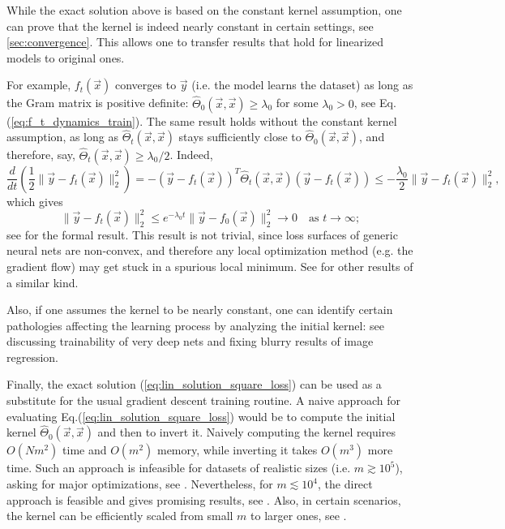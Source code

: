 \documentclass{article}
\begin{document}
    While the exact solution above is based on the constant kernel assumption, one can prove that the kernel is indeed nearly constant in certain settings, see \cref{sec:convergence}.
    This allows one to transfer results that hold for linearized models to original ones.
    
    For example, $f_t(\vec x)$ converges to $\vec y$ (i.e. the model learns the dataset) as long as the Gram matrix is positive definite: $\hat\Theta_0(\vec x,\vec x) \geq \lambda_0$ for some $\lambda_0 > 0$, see Eq.(\ref{eq:f_t_dynamics_train}).
    The same result holds without the constant kernel assumption, as long as $\hat\Theta_t(\vec x,\vec x)$ stays sufficiently close to $\hat\Theta_0(\vec x,\vec x)$, and therefore, say, $\hat\Theta_t(\vec x,\vec x) \geq \lambda_0/2$.
    Indeed,
    \begin{equation}
        \frac{d}{dt}\left(\frac{1}{2} \| \vec y - f_t(\vec x) \|_2^2\right)
        = -(\vec y - f_t(\vec x))^T \hat\Theta_t(\vec x, \vec x) (\vec y - f_t(\vec x))
        \leq -\frac{\lambda_0}{2} \| \vec y - f_t(\vec x) \|_2^2,
    \end{equation}
    which gives
    \begin{equation}
        \| \vec y - f_t(\vec x) \|_2^2
        \leq e^{-\lambda_0 t} \| \vec y - f_0(\vec x) \|_2^2
        \to 0 \quad \text{as $t \to \infty$};
    \end{equation}
    see \cite{du2018gradient} for the formal result.
    This result is not trivial, since loss surfaces of generic neural nets are non-convex, and therefore any local optimization method (e.g. the gradient flow) may get stuck in a spurious local minimum.
    See \cite{arora2019fine} for other results of a similar kind.

    Also, if one assumes the kernel to be nearly constant, one can identify certain pathologies affecting the learning process by analyzing the initial kernel: see \cite{martens2021rapid} discussing trainability of very deep nets and \cite{dupuis2021dnn,tancik2020fourier} fixing blurry results of image regression.

    Finally, the exact solution (\ref{eq:lin_solution_square_loss}) can be used as a substitute for the usual gradient descent training routine.
    A naive approach for evaluating Eq.(\ref{eq:lin_solution_square_loss}) would be to compute the initial kernel $\hat\Theta_0(\vec x, \vec x)$ and then to invert it.
    Naively computing the kernel requires $O(N m^2)$ time and $O(m^2)$ memory, while inverting it takes $O(m^3)$ more time.
    Such an approach is infeasible for datasets of realistic sizes (i.e. $m \gtrsim 10^5$), asking for major optimizations, see \cite{novak2019neural,novakfast,meanti2020kernel}.
    Nevertheless, for $m \lesssim 10^4$, the direct approach is feasible and gives promising results, see \cite{arora2019harnessing}.
    Also, in certain scenarios, the kernel can be efficiently scaled from small $m$ to larger ones, see \cite{radhakrishnan2021simple}.
\end{document}
